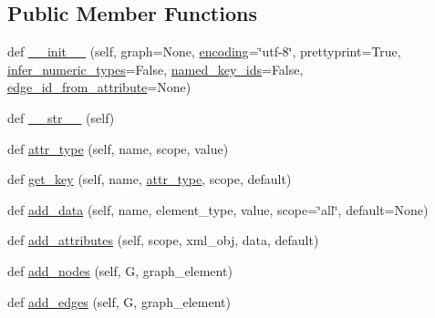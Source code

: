 \subsection*{Public Member Functions}
\begin{DoxyCompactItemize}
\item 
def \hyperlink{classnetworkx_1_1readwrite_1_1graphml_1_1GraphMLWriter_aff1d3a3459256b9122891ac9451c855b}{\+\_\+\+\_\+init\+\_\+\+\_\+} (self, graph=None, \hyperlink{classnetworkx_1_1readwrite_1_1graphml_1_1GraphMLWriter_a93b124d7c7e1d80add7c8e54a7f0df0a}{encoding}=\char`\"{}utf-\/8\char`\"{}, prettyprint=True, \hyperlink{classnetworkx_1_1readwrite_1_1graphml_1_1GraphMLWriter_a342a3cd82378829106af35e5122031ca}{infer\+\_\+numeric\+\_\+types}=False, \hyperlink{classnetworkx_1_1readwrite_1_1graphml_1_1GraphMLWriter_a89a439b25e941b82a0380ab97e185b1a}{named\+\_\+key\+\_\+ids}=False, \hyperlink{classnetworkx_1_1readwrite_1_1graphml_1_1GraphMLWriter_a5bee4a029dfdb4f0b66d50de8d8cf782}{edge\+\_\+id\+\_\+from\+\_\+attribute}=None)
\item 
def \hyperlink{classnetworkx_1_1readwrite_1_1graphml_1_1GraphMLWriter_a4161782dfbafac7620970da46961a5bf}{\+\_\+\+\_\+str\+\_\+\+\_\+} (self)
\item 
def \hyperlink{classnetworkx_1_1readwrite_1_1graphml_1_1GraphMLWriter_ae10301046808668379b99e2c7efe1ab7}{attr\+\_\+type} (self, name, scope, value)
\item 
def \hyperlink{classnetworkx_1_1readwrite_1_1graphml_1_1GraphMLWriter_a918b923f3620264a2b99ddd753998007}{get\+\_\+key} (self, name, \hyperlink{classnetworkx_1_1readwrite_1_1graphml_1_1GraphMLWriter_ae10301046808668379b99e2c7efe1ab7}{attr\+\_\+type}, scope, default)
\item 
def \hyperlink{classnetworkx_1_1readwrite_1_1graphml_1_1GraphMLWriter_af4453d5cf8ed8b422c2ad2e1abbdd783}{add\+\_\+data} (self, name, element\+\_\+type, value, scope=\char`\"{}all\char`\"{}, default=None)
\item 
def \hyperlink{classnetworkx_1_1readwrite_1_1graphml_1_1GraphMLWriter_a747d8b6c047d95f7ecea1decd5bce864}{add\+\_\+attributes} (self, scope, xml\+\_\+obj, data, default)
\item 
def \hyperlink{classnetworkx_1_1readwrite_1_1graphml_1_1GraphMLWriter_aae68de949b011ded7ecef99c1930127a}{add\+\_\+nodes} (self, G, graph\+\_\+element)
\item 
def \hyperlink{classnetworkx_1_1readwrite_1_1graphml_1_1GraphMLWriter_af61ec54300b81d42c2cc86f673041e53}{add\+\_\+edges} (self, G, graph\+\_\+element)

\end{DoxyCompactItemize}
